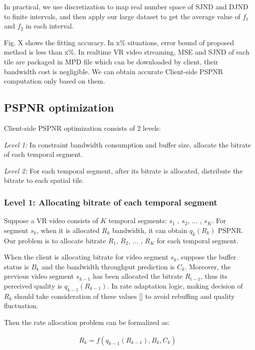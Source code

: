 In practical, we use discretization to map real number space of SJND and DJND to finite intervals, and then apply our large dataset to get the average value of $f_1$ and $f_2$ in each interval.

Fig. X shows the fitting accuracy. In x\% situations, error bound of proposed method is less than x\%. In realtime VR video streaming, MSE and SJND of each tile are packaged in MPD file which can be downloaded by client, their bandwidth cost is negligible. We can obtain accurate Client-side PSPNR computation only based on them.

\subsection{PSPNR optimization}

Client-side PSPNR optimization consists of 2 levels:

\emph{Level 1:} In constraint bandwidth consumption and buffer size, allocate the bitrate of each temporal segment.

\emph{Level 2:} For each temporal segment, after its bitrate is allocated, distribute the bitrate to each spatial tile.

\subsubsection{Level 1: Allocating bitrate of each temporal segment}

Suppose a VR video consists of $K$ temporal segments: $s_1$ , $s_2$, ... , $s_K$. For segment $s_k$, when it is allocated $R_k$ bandwidth, it can obtain $q_{k}(R_k)$ PSPNR. Our problem is to allocate bitrate $R_1$, $R_2$, ... , $R_K$ for each temporal segment.

When the client is allocating bitrate for video segment $s_k$, suppose the buffer status is $B_k$ and the bandwidth throughput prediction is $C_k$. Moreover, the previous video segment $s_{k-1}$ has been allocated the bitrate $R_{i-1}$, thus its perceived quality is $q_{k-1}(R_{k-1})$. In rate adaptation logic, making decision of $R_k$ should take consideration of these values [] to avoid rebuffing and quality fluctuation.

Then the rate allocation problem can be formalized as:

\begin{equation}
\begin{aligned}
R_k = f(q_{k-1}(R_{k-1}), B_k, C_k)
\end{aligned}
\end{equation}

